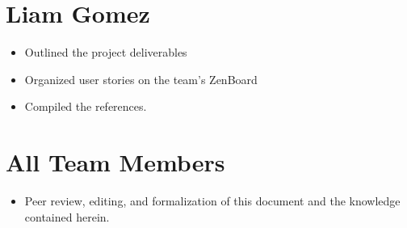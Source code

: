 \documentclass{scrreprt}
\begin{document}
	\section{Liam Gomez}
		\begin{itemize}
			\item Outlined the project deliverables
			\item Organized user stories on the team’s ZenBoard
			\item Compiled the references.
		\end{itemize}
	\section{All Team Members}
		\begin{itemize}
			\item Peer review, editing, and formalization of this document and the knowledge contained herein.
		\end{itemize}
\end{document}
